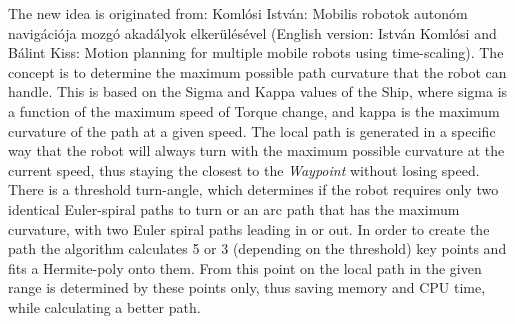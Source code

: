 The new idea is originated from: Koml\'osi Istv\'an: Mobilis robotok auton\'om navig\'aci\'oja mozg\'o akad\'alyok elker\"ul\'es\'evel (English version: Istv\'an Koml\'osi and B\'alint Kiss: Motion planning for multiple mobile robots using time-scaling).
The concept is to determine the maximum possible path curvature that the robot can handle. This is based on the Sigma and Kappa values of the Ship, where sigma is a function of the maximum speed of Torque change, and kappa is the maximum curvature of the path at a given speed. The local path is generated in a specific way that the robot will always turn with the maximum possible curvature at the current speed, thus staying the closest to the \emph{Waypoint} without losing speed. There is a threshold turn-angle, which determines if the robot requires only two identical Euler-spiral paths to turn or an arc path that has the maximum curvature, with two Euler spiral paths leading in or out.
In order to create the path the algorithm calculates 5 or 3 (depending on the threshold) key points and fits a Hermite-poly onto them. From this point on the local path in the given range is determined by these points only, thus saving memory and CPU time, while calculating a better path.
